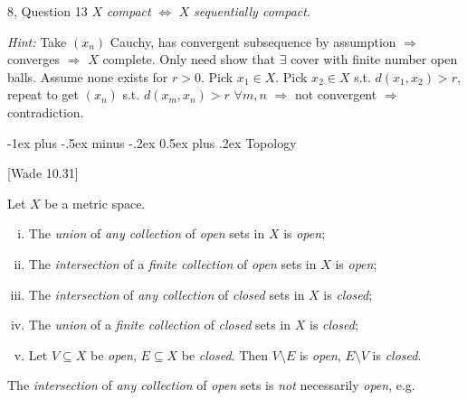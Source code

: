 \documentclass[10pt]{article} %
\makeatletter
\newcommand{\cw}[1]{[Wade #1]}
\newcommand{\cws}[2]{#1, Question #2}
\newcommand{\Hint}{\vspace{0.2em}\textit{Hint: }}
\renewcommand{\section}{\@startsection{section}{1}{0mm}%
                                {-1ex plus -.5ex minus -.2ex}%
                                {0.5ex plus .2ex}%
                                {\normalfont\large\bfseries}}
\makeatother
\begin{document}
\begin{multicols}{3}
\begin{workshop}{\cws{8}{13}}{}
    $X$ \emph{compact} $\Leftrightarrow$ $X$ \emph{sequentially compact}.

    \Hint Take $(x_n)$ Cauchy, has convergent subsequence by assumption $\Rightarrow$ converges $\Rightarrow$ $X$ complete. Only need show that $\exists$ cover with finite number open balls. Assume none exists for $r > 0$. Pick $x_1 \in X$. Pick $x_2 \in X$ s.t. $d(x_1,x_2) > r$, repeat to get $(x_n)$ s.t. $d(x_m,x_n) > r$ $\forall m,n$ $\Rightarrow$ not convergent $\Rightarrow$ contradiction.

\end{workshop}


\section{Topology}

\begin{theorem}{\cw{10.31}}{}

    Let $X$ be a metric space.

        \begin{enumerate}[i)]
            \setlength{\parskip}{0em}
            \item The \emph{union} of \emph{any collection} of \emph{open} sets in $X$ is \emph{open};
            \item The \emph{intersection} of a \emph{finite collection} of \emph{open} sets in $X$ is \emph{open};

            \item The \emph{intersection} of \emph{any collection} of \emph{closed} sets in $X$ is \emph{closed};
            \item The \emph{union} of a \emph{finite collection} of \emph{closed} sets in $X$ is \emph{closed};
            \item Let $V \subseteq X$ be \emph{open}, $E \subseteq X$ be \emph{closed}. Then $V \setminus E$ is \emph{open}, $E \setminus V$ is \emph{closed}.
        \end{enumerate}

\end{theorem}

\begin{remark}{10.32}{}

    The \emph{intersection} of \emph{any collection} of \emph{open} sets is \emph{not} necessarily \emph{open}, e.g.


\end{remark}
\end{multicols}
\end{document}
